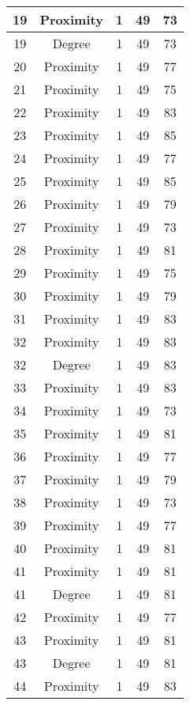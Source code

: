 \documentclass[results.tex]{subfiles}
\begin{document}
\begin{center}
\begin{tabular}{| c || c | c | c | c |}
    19 & Proximity & 1 & 49 & 73 \\ 
    \hline
    19 & Degree & 1 & 49 & 73 \\ 
    \hline
    20 & Proximity & 1 & 49 & 77 \\ 
    \hline
    21 & Proximity & 1 & 49 & 75 \\ 
    \hline
    22 & Proximity & 1 & 49 & 83 \\ 
    \hline
    23 & Proximity & 1 & 49 & 85 \\ 
    \hline
    24 & Proximity & 1 & 49 & 77 \\ 
    \hline
    25 & Proximity & 1 & 49 & 85 \\ 
    \hline
    26 & Proximity & 1 & 49 & 79 \\ 
    \hline
    27 & Proximity & 1 & 49 & 73 \\ 
    \hline
    28 & Proximity & 1 & 49 & 81 \\ 
    \hline
    29 & Proximity & 1 & 49 & 75 \\ 
    \hline
    30 & Proximity & 1 & 49 & 79 \\ 
    \hline
    31 & Proximity & 1 & 49 & 83 \\ 
    \hline
    32 & Proximity & 1 & 49 & 83 \\ 
    \hline
    32 & Degree & 1 & 49 & 83 \\ 
    \hline
    33 & Proximity & 1 & 49 & 83 \\ 
    \hline
    34 & Proximity & 1 & 49 & 73 \\ 
    \hline
    35 & Proximity & 1 & 49 & 81 \\ 
    \hline
    36 & Proximity & 1 & 49 & 77 \\ 
    \hline
    37 & Proximity & 1 & 49 & 79 \\ 
    \hline
    38 & Proximity & 1 & 49 & 73 \\ 
    \hline
    39 & Proximity & 1 & 49 & 77 \\ 
    \hline
    40 & Proximity & 1 & 49 & 81 \\ 
    \hline
    41 & Proximity & 1 & 49 & 81 \\ 
    \hline
    41 & Degree & 1 & 49 & 81 \\ 
    \hline
    42 & Proximity & 1 & 49 & 77 \\ 
    \hline
    43 & Proximity & 1 & 49 & 81 \\ 
    \hline
    43 & Degree & 1 & 49 & 81 \\ 
    \hline
    44 & Proximity & 1 & 49 & 83 \\ 

\end{tabular}
\end{center}
\end{document}
